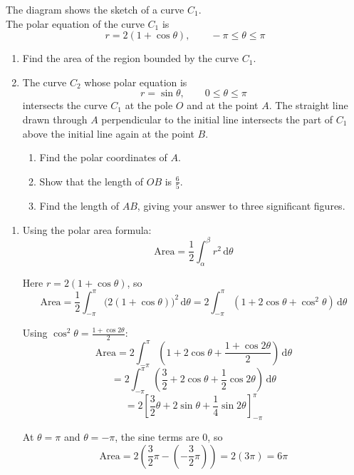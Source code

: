 \documentclass[leqno]{article}
\begin{document}
\begin{enumerate}[
  label=\textbf{\arabic*.},
  leftmargin=*,
  topsep=0pt,
  partopsep=0pt,
  parsep=0pt
]
The diagram shows the sketch of a curve $C_1$. \\

The polar equation of the curve $C_1$ is
\[
r = 2(1 + \cos \theta), \qquad -\pi \leq \theta \leq \pi
\]
\begin{enumerate}[label=\textbf{(\alph*)}]
  \item Find the area of the region bounded by the curve $C_1$.  \\
  \item The curve $C_2$ whose polar equation is
  \[
  r = \sin \theta, \qquad 0 \leq \theta \leq \pi
  \]
  intersects the curve $C_1$ at the pole $O$ and at the point $A$. The straight line drawn through $A$ perpendicular to the initial line intersects the part of $C_1$ above the initial line again at the point $B$. \\
  \begin{enumerate}[label=(\roman*)]
    \item Find the polar coordinates of $A$. 
    \item Show that the length of $OB$ is $\frac{6}{5}$. 
    \item Find the length of $AB$, giving your answer to three significant figures. 
  \end{enumerate}
\end{enumerate}

\vspace*{10pt}

\begin{djsSolution}
\begin{enumerate}[label=\textbf{(\alph*)}]
  \item Using the polar area formula:
\[
\text{Area}=\frac12\int_{\alpha}^{\beta} r^2\,\mathrm{d}\theta
\]

Here \(r=2(1+\cos\theta)\), so
\[
\text{Area}=\frac12\int_{-\pi}^{\pi}\bigl(2(1+\cos\theta)\bigr)^2\,\mathrm{d}\theta
=2\int_{-\pi}^{\pi}(1+2\cos\theta+\cos^2\theta)\,\mathrm{d}\theta
\]

Using \(\cos^2\theta=\frac{1+\cos 2\theta}{2}\):
\[
\text{Area}
=2\int_{-\pi}^{\pi}\left(1+2\cos\theta+\frac{1+\cos2\theta}{2}\right)\,\mathrm{d}\theta
\]
\[
=2\int_{-\pi}^{\pi}\left(\frac32+2\cos\theta+\frac12\cos2\theta\right)\,\mathrm{d}\theta
\]
\[
=2\left[\frac32\theta+2\sin\theta+\frac14\sin2\theta\right]_{-\pi}^{\pi}
\]

At \(\theta=\pi\) and \(\theta=-\pi\), the sine terms are \(0\), so
\[
\text{Area}
=2\left(\frac32\pi-\left(-\frac32\pi\right)\right)
=2(3\pi)
=6\pi
\]


\end{enumerate}
\end{djsSolution}
\end{enumerate}
\end{document}
